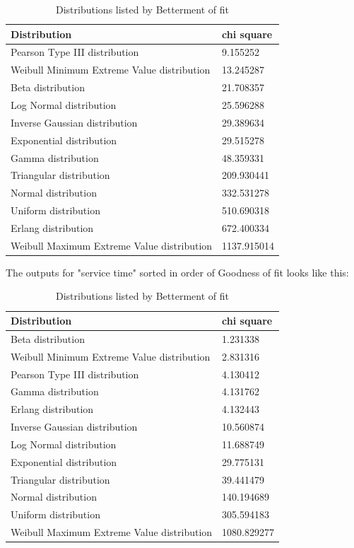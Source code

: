 \documentclass{article}
\begin{document}
\begin{table}[H]
    \centering
    \caption{Distributions listed by Betterment of fit}
    \begin{tabu}{*{2}{X[c]}}
        \toprule
        \textbf{Distribution} & \textbf{chi square}\\
        \midrule
        Pearson Type III distribution & 9.155252\\
        Weibull Minimum Extreme Value distribution & 13.245287\\
        Beta distribution & 21.708357\\
        Log Normal distribution & 25.596288\\
        Inverse Gaussian distribution & 29.389634\\
        Exponential distribution & 29.515278\\
        Gamma distribution & 48.359331\\
        Triangular distribution & 209.930441\\
        Normal distribution & 332.531278\\
        Uniform distribution & 510.690318\\
        Erlang distribution & 672.400334\\
        Weibull Maximum Extreme Value distribution & 1137.915014\\
        \bottomrule
    \end{tabu}
    \label{tab:Inter-arrival Best Fit}
\end{table}

The outputs for "service time" sorted in order of Goodness of fit looks like this:

\begin{table}[h!]
    \centering
    \caption{Distributions listed by Betterment of fit}
    \begin{tabu}{*{2}{X[c]}}
        \toprule
        \textbf{Distribution} & \textbf{chi square}\\
        \midrule
        Beta distribution & 1.231338\\
        Weibull Minimum Extreme Value distribution & 2.831316\\
        Pearson Type III distribution & 4.130412\\
        Gamma distribution & 4.131762\\
        Erlang distribution & 4.132443\\
        Inverse Gaussian distribution & 10.560874\\
        Log Normal distribution & 11.688749\\
        Exponential distribution & 29.775131\\
        Triangular distribution & 39.441479\\
        Normal distribution & 140.194689\\
        Uniform distribution & 305.594183\\
        Weibull Maximum Extreme Value distribution & 1080.829277\\
        \bottomrule
    \end{tabu}
    \label{tab:Service Best Fit}
\end{table}
\end{document}
